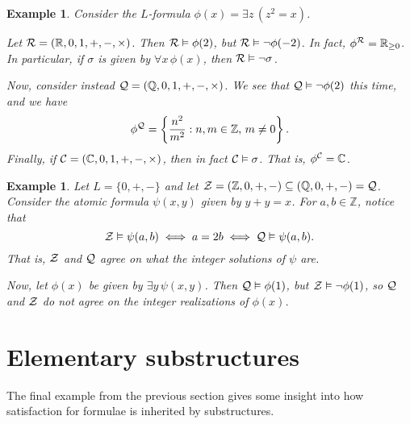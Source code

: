 \documentclass[10pt]{article}
\newcommand{\R}{\mathbb{R}}
\newcommand{\C}{\mathbb{C}}
\newcommand{\Z}{\mathbb{Z}}
\newcommand{\Q}{\mathbb{Q}}
\theoremstyle{newstyle}
\newtheorem{exmp}[thm]{Example}
\begin{document}
\begin{exmp}
Consider the $L$-formula $\phi(x) = \exists z \, (z^2 = x)$. 

Let ${\cal R} = (\R, 0, 1, +, -, \times)$. Then ${\cal R} \vDash \phi(2)$, but 
${\cal R} \vDash \neg \phi(-2)$. In fact, $\phi^{\cal R} = \R_{\geq0}$. In particular, if 
$\sigma$ is given by $\forall x \, \phi(x)$, then ${\cal R} \vDash \neg \sigma$. 

Now, consider instead ${\cal Q} = (\Q, 0, 1, +, -, \times)$. We see that ${\cal Q} \vDash 
\neg \phi(2)$ this time, and we have 
\[ \phi^{\cal Q} = \left\{\frac{n^2}{m^2} : n,m\in\Z,\, m \neq 0\right\}. \]
Finally, if ${\cal C} = (\C, 0, 1, +, -, \times)$, then in fact ${\cal C} \vDash \sigma$. 
That is, $\phi^{\cal C} = \C$.
\end{exmp}

\begin{exmp}
Let $L = \{0, +, -\}$ and let ${\cal Z} = (\Z, 0, +, -) \subseteq (\Q, 0, +, -) = {\cal Q}$.
Consider the atomic formula $\psi(x, y)$ given by $y + y = x$. For $a, b \in \Z$, notice that 
\[ {\cal Z} \vDash \psi(a, b) \iff a = 2b \iff {\cal Q} \vDash \psi(a, b). \]
That is, ${\cal Z}$ and ${\cal Q}$ agree on what the integer solutions of $\psi$ are. 

Now, let $\phi(x)$ be given by $\exists y \, \psi(x, y)$. Then ${\cal Q} \vDash \phi(1)$, 
but ${\cal Z} \vDash \neg \phi(1)$, so ${\cal Q}$ and ${\cal Z}$ do not agree on the 
integer realizations of $\phi(x)$.
\end{exmp}

\newpage 
\section{Elementary substructures}

The final example from the previous section gives some insight into how satisfaction 
for formulae is inherited by substructures.
\end{document}
